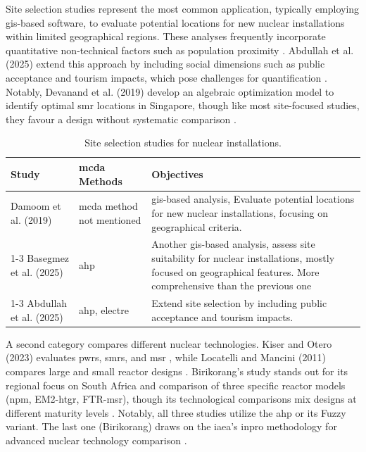 Site selection studies represent the most common application, typically employing \gls{gis}-based software, to evaluate potential locations for new nuclear installations within limited geographical regions. These analyses frequently incorporate quantitative non-technical factors such as population proximity \cite{DAMOOM2019110, BASEGMEZ2025105897}. Abdullah et al. (2025) extend this approach by including social dimensions such as public acceptance and tourism impacts, which pose challenges for quantification \cite{ABDULLAH2025105626}. Notably, Devanand et al. (2019) develop an algebraic optimization model to identify optimal \gls{smr} locations in Singapore, though like most site-focused studies, they favour a design without systematic comparison \cite{DEVANAND2019339}.


\begin{table}[htbp]
    \centering
    \begin{tabularx}{\textwidth}{XXX}
        \toprule
        \textbf{Study} & \textbf{\gls{mcda} Methods} & \textbf{Objectives} \\
        \midrule
        Damoom et al. (2019) \cite{DAMOOM2019110} & \gls{mcda} method not mentioned & \gls{gis}-based analysis, Evaluate potential locations for new nuclear installations, focusing on geographical criteria. \\
        \cmidrule(lr){1-3}
        Basegmez et al. (2025) \cite{BASEGMEZ2025105897} & \gls{ahp} & Another \gls{gis}-based analysis, assess site suitability for nuclear installations, mostly focused on geographical features. More comprehensive than the previous one \\
        \cmidrule(lr){1-3}
        Abdullah et al. (2025) \cite{ABDULLAH2025105626} & \gls{ahp}, \acrshort{electre} & Extend site selection by including public acceptance and tourism impacts. \\
        \bottomrule
    \end{tabularx}
    \caption{Site selection studies for nuclear installations.}
    \label{tab:site_selection_studies}
\end{table}

A second category compares different nuclear technologies. Kiser and Otero (2023) evaluates \glspl{pwr}, \glspl{smr}, and \gls{msr} \cite{KISER2023104647}, while Locatelli and Mancini (2011) compares large and small reactor designs \cite{Locatelli01092012}. Birikorang's study stands out for its regional focus on South Africa and comparison of three specific reactor models (\gls{npm}, EM2-\acrshort{htgr}, FTR-\acrshort{msr}), though its technological comparisons mix designs at different maturity levels \cite{BIRIKORANG2026111837}. Notably, all three studies utilize the \gls{ahp} or its Fuzzy variant. The last one (Birikorang) draws on the \gls{iaea}'s \acrshort{inpro} methodology for advanced nuclear technology comparison \cite{IAEA_INPRO_2019}.

